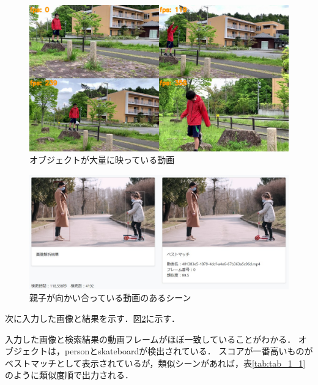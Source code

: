 \documentclass[a4j,12pt,dvipdfmx]{jreport}
\begin{document}
\begin{figure}[t]
  \centering
  \includegraphics[width=13cm]{image/5_result.jpg}
  \caption{オブジェクトが大量に映っている動画}
  \label{fig:movie5}
\end{figure}

\begin{figure}[H]
  \centering
  \includegraphics[width=13cm]{image/result_1_1.jpg}
  \caption{親子が向かい合っている動画のあるシーン}
  \label{fig:img_1_1}
\end{figure}
次に入力した画像と結果を示す．図\ref{fig:img_1_1}に示す．

入力した画像と検索結果の動画フレームがほぼ一致していることがわかる．
オブジェクトは，personとskateboardが検出されている．
スコアが一番高いものがベストマッチとして表示されているが，類似シーンがあれば，表\ref{tab:tab_1_1}のように類似度順で出力される．
\end{document}
